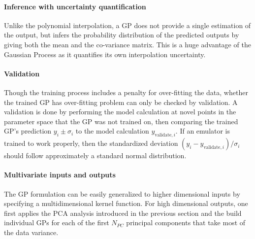 \paragraph{Inference with uncertainty quantification} Unlike the polynomial interpolation, a GP does not provide a single estimation of the output, but infers the probability distribution of the predicted outputs by giving both the mean and the co-variance matrix.
This is a huge advantage of the Gaussian Process as it quantifies its own interpolation uncertainty.

\paragraph{Validation} Though the training process includes a penalty for over-fitting the data, whether the trained GP has over-fitting problem can only be checked by validation.
A validation is done by performing the model calculation at novel points in the parameter space that the GP was not trained on, then comparing the trained GP's prediction $y_i \pm \sigma_i$ to the model calculation $y_{\textrm{validate}, i}$.
If an emulator is trained to work properly, then the standardized deviation $(y_i - y_{\textrm{validate}, i})/\sigma_i$ should follow approximately a standard normal distribution.

\paragraph{Multivariate inputs and outputs} The GP formulation can be easily generalized to higher dimensional inputs by specifying a multidimensional kernel function.
For high dimensional outputs, one first applies the PCA analysis introduced in the previous section and the build individual GPs for each of the first $N_{PC}$ principal components that take most of the data variance.

